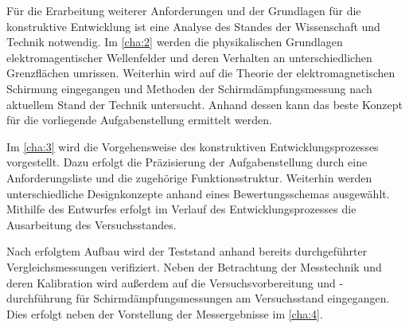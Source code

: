 Für die Erarbeitung weiterer Anforderungen und der Grundlagen für die konstruktive Entwicklung ist eine Analyse des Standes der Wissenschaft und Technik notwendig. Im \Kapitel\ref{cha:2} werden die physikalischen Grundlagen elektromagentischer Wellenfelder und deren Verhalten an unterschiedlichen Grenzflächen umrissen. Weiterhin wird auf die Theorie der elektromagnetischen Schirmung eingegangen und Methoden der Schirmdämpfungsmessung nach aktuellem Stand der Technik untersucht. Anhand dessen kann das beste Konzept für die vorliegende Aufgabenstellung ermittelt werden.
\par
\vspace{\linespace}
Im \Kapitel\ref{cha:3} wird die Vorgehensweise des konstruktiven Entwicklungsprozesses vorgestellt. Dazu erfolgt die Präzisierung der Aufgabenstellung durch eine Anforderungsliste und die zugehörige Funktionsstruktur. Weiterhin werden unterschiedliche Designkonzepte anhand eines Bewertungsschemas ausgewählt. Mithilfe des Entwurfes erfolgt im Verlauf des Entwicklungsprozesses die Ausarbeitung des Versuchs\-standes. 
\par
\vspace{\linespace}
Nach erfolgtem Aufbau wird der Teststand anhand bereits durchgeführter Vergleichsmessungen verifiziert. Neben der Betrachtung der Messtechnik und deren Kalibration wird außerdem auf die Versuchsvorbereitung und -durchführung für Schirmdämpfungsmessungen am Versuchsstand eingegangen. Dies erfolgt neben der Vorstellung der Messergebnisse im \Kapitel\ref{cha:4}.

